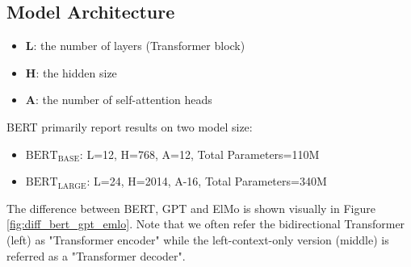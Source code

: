 \documentclass[a3paper, 12pt]{book} %
\newcommand\bolden[1]{{\boldmath\bfseries#1}}
\begin{document}
\subsection{Model Architecture}
\begin{itemize}
	\item \textbf{L}: the number of layers (Transformer block)
	\item \textbf{H}: the hidden size 
	\item \textbf{A}: the number of self-attention heads
\end{itemize}
BERT primarily report results on two model size:
\begin{itemize}
	\item \bolden{$\text{BERT}_{\text{BASE}}$}: L=12, H=768, A=12, Total Parameters=110M
	\item \bolden{$\text{BERT}_{\text{LARGE}}$}: L=24, H=2014, A-16, Total Parameters=340M
\end{itemize}
The difference between BERT, GPT and ElMo is shown visually in Figure \ref{fig:diff_bert_gpt_emlo}. Note that we often refer the bidirectional Transformer (left) as "Transformer encoder" while the left-context-only version (middle) is referred as a "Transformer decoder".
\end{document}
